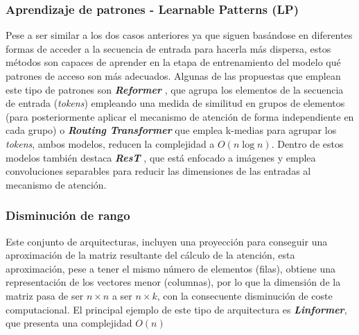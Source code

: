 \documentclass[a4paper]{article}
\newcommand{\textbfit}[1]{\textbf{\textit{#1}}}
\begin{document}
\subsubsection{Aprendizaje de patrones - Learnable Patterns (LP)}
Pese a ser similar a los dos casos anteriores ya que siguen basándose en diferentes formas de acceder a la secuencia de entrada para hacerla más dispersa, estos métodos son capaces de aprender en la etapa de entrenamiento del modelo qué patrones de acceso son más adecuados. Algunas de las propuestas que emplean este tipo de patrones son \textbfit{Reformer} \cite{Kitaev2020Reformer:}, que agrupa los elementos de la secuencia de entrada (\textit{tokens}) empleando una medida de similitud en grupos de elementos (para posteriormente aplicar el mecanismo de atención de forma independiente en cada grupo) o \textbfit{Routing Transformer} \cite{routingtransformer} que emplea k-medias para agrupar los \textit{tokens}, ambos modelos, reducen la complejidad a $O(n \log n)$. Dentro de estos modelos también destaca \textbfit{ResT} \cite{zhql2021ResT}, que está enfocado a imágenes y emplea convoluciones separables para reducir las dimensiones de las entradas al mecanismo de atención.


\subsubsection{Disminución de rango}
Este conjunto de arquitecturas, incluyen una proyección para conseguir una aproximación de la matriz resultante del cálculo de la atención, esta aproximación, pese a tener el mismo número de elementos (filas), obtiene una representación de los vectores menor (columnas), por lo que la dimensión de la matriz pasa de ser $n \times n$ a ser $n \times k$, con la consecuente disminución de coste computacional. El principal ejemplo de este tipo de arquitectura es \textbfit{Linformer}, \cite{wang2020linformer} que presenta una complejidad $O(n)$
\end{document}
